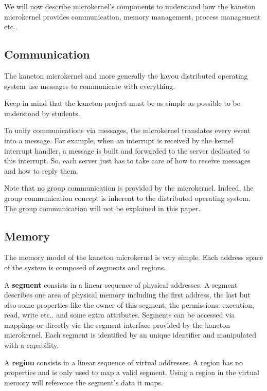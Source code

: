 \begin{multicols}{2}
We will now describe microkernel's components to understand how the kaneton
microkernel provides communication, memory management, process management etc..

%
%

\subsection{Communication}

The kaneton microkernel and more generally the kayou distributed operating
system use messages to communicate with everything.

Keep in mind that the kaneton project must be as simple as possible to be
understood by students.

To unify communications via messages, the microkernel translates every event
into a message. For example, when an interrupt is received by the kernel
interrupt handler, a message is built and forwarded to the server dedicated
to this interrupt. So, each server just has to take care of how to receive
messages and how to reply them.

Note that no group communication is provided by the microkernel. Indeed, the
group communication concept is inherent to the distributed operating system.
The group communication will not be explained in this paper.

%
%

\subsection{Memory}

The memory model of the kaneton microkernel is very simple. Each address space
of the system is composed of segments and regions.

A \textbf{segment} consists in a linear sequence of physical addresses.
A segment describes one area of physical memory including the
first address, the last but also some properties like the owner of this
segment, the permissions: execution, read, write etc.. and some
extra attributes. Segments can be accessed via mappings or directly via
the segment interface provided by the kaneton microkernel. Each segment
is identified by an unique identifier and manipulated with a capability.

A \textbf{region} consists in a linear sequence of virtual addresses.
A region has no properties and is only used to map a valid segment.
Using a region in the virtual memory will reference the segment's data
it maps.


\end{multicols}
